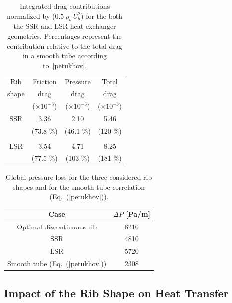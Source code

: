\begin{table}
\small
\centering
\begin{tabular}{cccc}
   Rib & Friction & Pressure & Total \\
   shape & drag  & drag & drag \\
         & ($\times 10^{-3}$) & ($\times 10^{-3}$) & ($\times 10^{-3}$) \\
  \hline
  SSR & 3.36 & 2.10 & 5.46 \\
      & (73.8 \%) & (46.1 \%) & (120 \%) \\
  \\
  LSR & 3.54 & 4.71 & 8.25 \\
      & (77.5 \%) & (103 \%) & (181 \%) \\
  \hline
\end{tabular}
\caption{Integrated drag contributions normalized by ($0.5 ~ \rho_b ~ U_b^2$) for the both the SSR and LSR heat exchanger geometries. Percentages represent the contribution relative to the total drag in a smooth tube according to~\cref{petukhov}.}
\label{tab_drags_compare}
\end{table}

\begin{table}
\small
\centering
\begin{tabular}{cc}
  Case & $\Delta P$ [Pa/m] \\
  \hline
  Optimal discontinuous rib & 6210 \\
  SSR & 4810 \\
  LSR & 5720 \\
  Smooth tube (Eq.~(\ref{petukhov})) & 2308 \\
  \hline
\end{tabular}
\caption{Global pressure loss for the three considered rib shapes and for the smooth tube correlation (Eq.~(\ref{petukhov})).}
\label{tab_pressureloss_compare}
\end{table}

\subsection{Impact of the Rib Shape on Heat Transfer}
\label{sec:swirl_impact}

